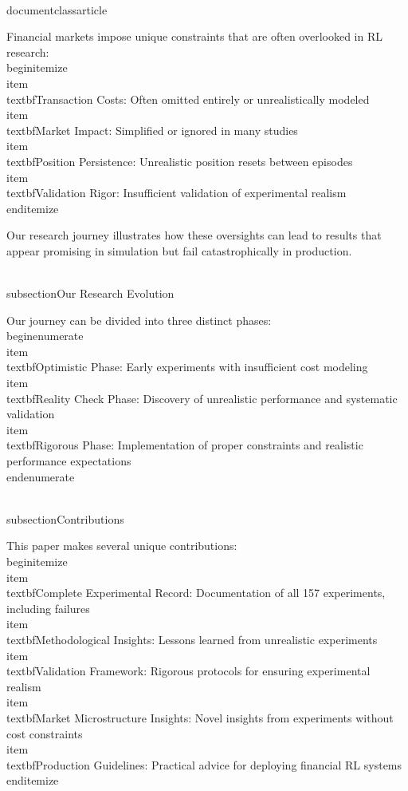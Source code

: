 \\documentclass{article}
\begin{document}
Financial markets impose unique constraints that are often overlooked in RL research:
\\begin{itemize}
\\item \\textbf{Transaction Costs}: Often omitted entirely or unrealistically modeled
\\item \\textbf{Market Impact}: Simplified or ignored in many studies
\\item \\textbf{Position Persistence}: Unrealistic position resets between episodes
\\item \\textbf{Validation Rigor}: Insufficient validation of experimental realism
\\end{itemize}

Our research journey illustrates how these oversights can lead to results that appear promising in simulation but fail catastrophically in production.

\\subsection{Our Research Evolution}

Our journey can be divided into three distinct phases:
\\begin{enumerate}
\\item \\textbf{Optimistic Phase}: Early experiments with insufficient cost modeling
\\item \\textbf{Reality Check Phase}: Discovery of unrealistic performance and systematic validation
\\item \\textbf{Rigorous Phase}: Implementation of proper constraints and realistic performance expectations
\\end{enumerate}

\\subsection{Contributions}

This paper makes several unique contributions:
\\begin{itemize}
\\item \\textbf{Complete Experimental Record}: Documentation of all 157 experiments, including failures
\\item \\textbf{Methodological Insights}: Lessons learned from unrealistic experiments
\\item \\textbf{Validation Framework}: Rigorous protocols for ensuring experimental realism
\\item \\textbf{Market Microstructure Insights}: Novel insights from experiments without cost constraints
\\item \\textbf{Production Guidelines}: Practical advice for deploying financial RL systems
\\end{itemize}
\n\n
\end{document}
